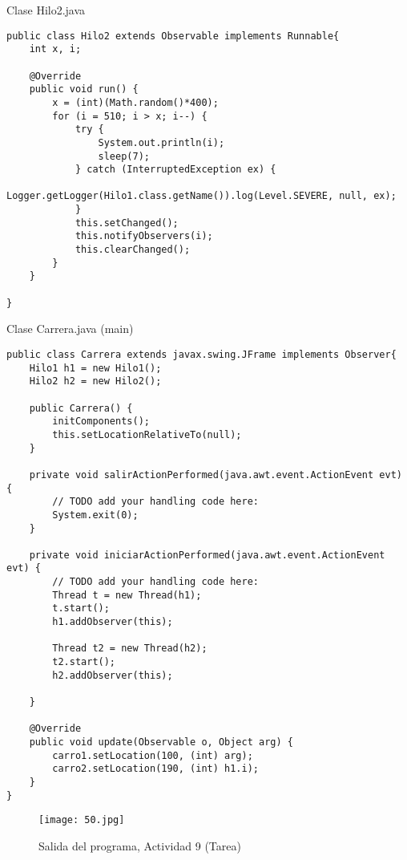 \begin{center}
Clase Hilo2.java
\end{center}

\begin{verbatim}
public class Hilo2 extends Observable implements Runnable{
    int x, i;

    @Override
    public void run() {
        x = (int)(Math.random()*400);
        for (i = 510; i > x; i--) {
            try {
                System.out.println(i);
                sleep(7);
            } catch (InterruptedException ex) {
                Logger.getLogger(Hilo1.class.getName()).log(Level.SEVERE, null, ex);
            }
            this.setChanged();
            this.notifyObservers(i);
            this.clearChanged();
        }
    }
    
}
\end{verbatim} \vspace{1cm}

\begin{center}
Clase Carrera.java (main)
\end{center}

\begin{verbatim}
public class Carrera extends javax.swing.JFrame implements Observer{
    Hilo1 h1 = new Hilo1();
    Hilo2 h2 = new Hilo2();
    
    public Carrera() {
        initComponents();
        this.setLocationRelativeTo(null);
    }

    private void salirActionPerformed(java.awt.event.ActionEvent evt) {                                      
        // TODO add your handling code here:
        System.exit(0);
    }                                     

    private void iniciarActionPerformed(java.awt.event.ActionEvent evt) {                                        
        // TODO add your handling code here:
        Thread t = new Thread(h1);
        t.start();
        h1.addObserver(this);
        
        Thread t2 = new Thread(h2);
        t2.start();
        h2.addObserver(this);

    }              

    @Override
    public void update(Observable o, Object arg) {
        carro1.setLocation(100, (int) arg);
        carro2.setLocation(190, (int) h1.i);
    }
}
\end{verbatim} \vspace{1cm}
\begin{figure}[h!]
		\centering
		{\texttt{[image: 50.jpg]}\par} 
		\caption{Salida del programa, Actividad 9 (Tarea)}\vspace{1cm}
\end{figure}\newpage

